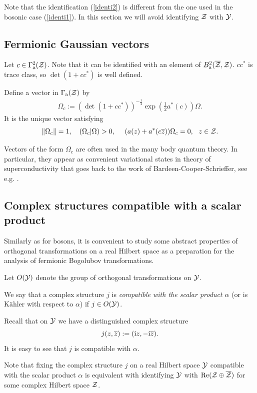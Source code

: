 \documentclass{svmult}
\newcommand{\beq}{\begin{equation}}
\newcommand{\eeq}{\end{equation}}
\def\bet{\begin{theorem}}
\def\eet{\end{theorem}}
\def\Re{{\rm Re}}
\def\bar{\overline}
\def\12{{\frac12}}
\def\cZ{{\cal Z}}
\def\cY{{\cal Y}}
\def\a{{\rm a}}
\def\i{{\rm i}}
\def\12{\frac{1}{2}}
\def\12{\frac{1}{2}}
\begin{document}
Note that the identification (\ref{identi2})
is different from the one used in the bosonic
 case (\ref{identi1}).
In this section we will avoid identifying  $\cZ$ with $\cY$.





\subsection{Fermionic Gaussian vectors}




Let $c\in\Gamma_\a^2(\cZ)$. Note that it can be identified with an
element of $ B_\a^2(\bar\cZ,\cZ)$. 
 $cc^*$ is trace class, so
$\det(1+cc^*)$ is well defined. 

\bet 
 Define a vector in $\Gamma_\a(\cZ)$ by
\beq\begin{array}{l}
\Omega_c:=\left(\det(1+cc^*)\right)^{-\frac{1}{4}}\exp(\12
a^*(c))\Omega.\end{array}\label{dsa}\eeq 
It is  
the unique vector satisfying
\[\|\Omega_c\|=1,\ \ \ (\Omega_c|\Omega)>0,\ \ \ \
(a(z)+a^*(c\bar z))\Omega_c=0,\ \ z\in\cZ.\]
\label{sqoa}\eet

Vectors of the form $\Omega_c$ are often used in the many body quantum
theory. In particular, they appear as convenient variational states in theory
of
 superconductivity that goes back to the work of
Bardeen-Cooper-Schrieffer, see e.g. \cite{FW}. 




\subsection{Complex structures compatible with a scalar product}


Similarly as for bosons, it is convenient to study some abstract properties of
orthogonal transformations on a real Hilbert space as a preparation for the
analysis of fermionic Bogolubov transformations. 

Let $O(\cY)$ denote the group of orthogonal transformations on $\cY$.

We say that a complex structure $j$ is {\em compatible with the scalar product
$\alpha$} (or is K\"ahler with respect to $\alpha$) if
$j\in O(\cY)$. 


Recall that on $\cY$ we have a distinguished
complex structure
\[j(z,\bar z):=(\i z,-\i \bar z).\]
It is easy to see that $j$ is compatible with $\alpha$.

Note that fixing the complex structure $j$ on a real Hilbert space $\cY$
compatible with the scalar product
 $\alpha$ is equivalent with identifying $\cY$ with
$\Re(\cZ\oplus\bar\cZ)$ for some complex Hilbert space $\cZ$.
\end{document}
